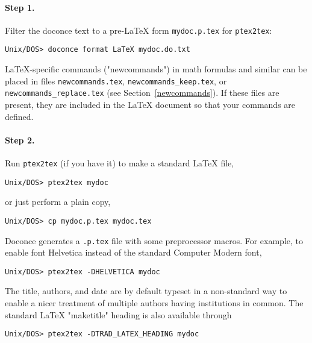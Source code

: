 \documentclass{article}
\begin{document}
\paragraph{Step 1.}
Filter the doconce text to a pre-{\LaTeX} form {\fontsize{10pt}{10pt}\verb!mydoc.p.tex!} for
     {\fontsize{10pt}{10pt}\verb!ptex2tex!}:
\vspace{4pt}
\begin{Verbatim}[numbers=none,frame=lines,label=\fbox{{\tiny Terminal}},fontsize=\fontsize{9pt}{9pt},
labelposition=topline,framesep=2.5mm,framerule=0.7pt]
Unix/DOS> doconce format LaTeX mydoc.do.txt
\end{Verbatim}
{\LaTeX}-specific commands ("newcommands") in math formulas and similar
can be placed in files {\fontsize{10pt}{10pt}\verb!newcommands.tex!}, {\fontsize{10pt}{10pt}\verb!newcommands_keep.tex!}, or
{\fontsize{10pt}{10pt}\verb!newcommands_replace.tex!} (see Section~\ref{newcommands}). 
If these files are present, they are included in the {\LaTeX} document 
so that your commands are defined.

\paragraph{Step 2.}
Run {\fontsize{10pt}{10pt}\verb!ptex2tex!} (if you have it) to make a standard {\LaTeX} file,
\vspace{4pt}
\begin{Verbatim}[numbers=none,frame=lines,label=\fbox{{\tiny Terminal}},fontsize=\fontsize{9pt}{9pt},
labelposition=topline,framesep=2.5mm,framerule=0.7pt]
Unix/DOS> ptex2tex mydoc
\end{Verbatim}
or just perform a plain copy,
\vspace{4pt}
\begin{Verbatim}[numbers=none,frame=lines,label=\fbox{{\tiny Terminal}},fontsize=\fontsize{9pt}{9pt},
labelposition=topline,framesep=2.5mm,framerule=0.7pt]
Unix/DOS> cp mydoc.p.tex mydoc.tex
\end{Verbatim}
Doconce generates a {\fontsize{10pt}{10pt}\verb!.p.tex!} file with some preprocessor macros.
For example, to enable font Helvetica instead of the standard
Computer Modern font,
\vspace{4pt}
\begin{Verbatim}[numbers=none,frame=lines,label=\fbox{{\tiny Terminal}},fontsize=\fontsize{9pt}{9pt},
labelposition=topline,framesep=2.5mm,framerule=0.7pt]
Unix/DOS> ptex2tex -DHELVETICA mydoc
\end{Verbatim}
The title, authors, and date are by default typeset in a non-standard
way to enable a nicer treatment of multiple authors having
institutions in common. The standard {\LaTeX} "maketitle" heading
is also available through
\vspace{4pt}
\begin{Verbatim}[numbers=none,frame=lines,label=\fbox{{\tiny Terminal}},fontsize=\fontsize{9pt}{9pt},
labelposition=topline,framesep=2.5mm,framerule=0.7pt]
Unix/DOS> ptex2tex -DTRAD_LATEX_HEADING mydoc
\end{Verbatim}
\end{document}
